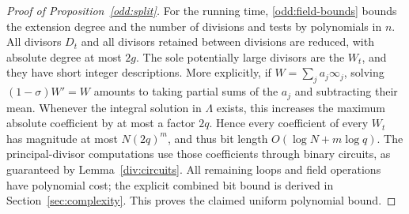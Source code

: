 \begin{proof}[Proof of Proposition~\ref{odd:split}]
For the running time, \eqref{odd:field-bounds} bounds the extension degree
and the number of divisions and tests by polynomials in $n$.
All divisors $D_t$ and all divisors retained between divisions are reduced,
with absolute degree at most $2g$.
The sole potentially large divisors are the $W_t$, and they have short
integer descriptions.  More explicitly, if
$W=\sum_j a_j\infty_j$, solving $(1-\sigma)W'=W$ amounts to taking
partial sums of the $a_j$ and subtracting their mean.  Whenever the
integral solution in $\Lambda$ exists, this increases the maximum
absolute coefficient by at most a factor $2q$.
Hence every coefficient of every $W_t$ has magnitude at most
$N(2q)^m$, and thus bit length $O(\log N+m\log q)$.
The principal-divisor computations use those coefficients through binary
circuits, as guaranteed by Lemma~\ref{div:circuits}.
All remaining loops and field operations have polynomial cost; the
explicit combined bit bound is derived in Section~\ref{sec:complexity}.
This proves the claimed uniform polynomial bound.
\end{proof}
